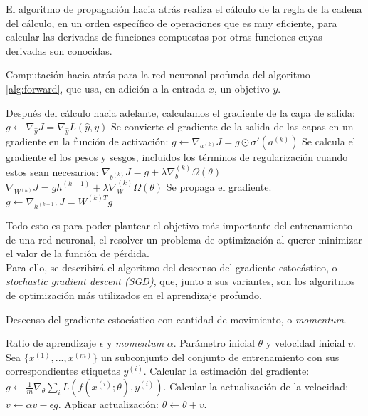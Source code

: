 \begin{itemize}
El algoritmo de propagación hacia atrás realiza el cálculo de la regla de la cadena del cálculo, en un orden específico de operaciones que es muy eficiente, para calcular las derivadas de funciones compuestas por otras funciones cuyas derivadas son conocidas. \\
\begin{algorithm}
\caption{Computación hacia atrás para la red neuronal profunda del algoritmo \autoref{alg:forward}, que usa, en adición a la entrada $x$, un objetivo $y$. \cite{Goodfellow-et-al-2016}}
\begin{algorithmic}
\STATE Después del cálculo hacia adelante, calculamos el gradiente de la capa de salida:
\STATE $g\leftarrow\nabla_{\hat{y}}J=\nabla_{\hat{y}}L(\hat{y},y)$
\STATE Se convierte el gradiente de la salida de las capas en un gradiente en la función de activación:
\STATE $g\leftarrow \nabla_{a^(k)}J=g\odot\sigma'(a^{(k)})$
\STATE Se calcula el gradiente el los pesos y sesgos, incluidos los términos de regularización cuando estos sean necesarios:
\STATE $\nabla_{b^{(k)}}J=g+\lambda\nabla_b^(k)\Omega(\theta)$
\STATE $\nabla_{W^{(k)}}J=gh^{(k-1)}+\lambda\nabla_W^{(k)}\Omega(\theta)$
\STATE Se propaga el gradiente.
\STATE $g\leftarrow \nabla_{h^{(k-1)}}J=W^{(k)T}g$
\ENDFOR
\end{algorithmic}
\end{algorithm}

Todo esto es para poder plantear el objetivo más importante del entrenamiento de una red neuronal, el resolver un problema de optimización al querer minimizar el valor de la función de pérdida. \\

Para ello, se describirá el algoritmo del descenso del gradiente estocástico, o \emph{stochastic gradient descent (SGD)}, que, junto a sus variantes, son los algoritmos de optimización más utilizados en el aprendizaje profundo. \\

\begin{algorithm}
\caption{Descenso del gradiente estocástico con cantidad de movimiento, o \emph{momentum}. \cite{Goodfellow-et-al-2016}}
\begin{algorithmic}
\REQUIRE Ratio de aprendizaje $\epsilon$ y \emph{momentum} $\alpha$.
\REQUIRE Parámetro inicial $\theta$ y velocidad inicial $v$.
\STATE Sea $\{x^{(1)},...,x^{(m)}\}$  un subconjunto del conjunto de entrenamiento con sus correspondientes etiquetas $y^{(i)}$.
\STATE Calcular la estimación del gradiente: $g\leftarrow \frac{1}{m}\nabla_\theta \sum_i L(f(x^{(i)};\theta),y^{(i)})$.
\STATE Calcular la actualización de la velocidad: $v \leftarrow \alpha v - \epsilon g$.
\STATE Aplicar actualización: $\theta \leftarrow \theta + v$.
\ENDWHILE
\end{algorithmic}
\end{algorithm}


\end{itemize}
